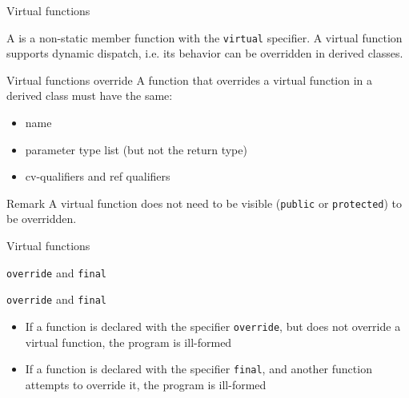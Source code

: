 \begin{frame}{Virtual functions}{}
  \begin{definition}
    A  is a non-static member function with the \lstinline!virtual! specifier. A virtual function supports dynamic dispatch, i.e. its behavior can be overridden in derived classes.
  \end{definition}

  \begin{block}{Virtual functions override}
    A function that overrides a virtual function in a derived class must have the same:
    \begin{itemize}
    \item
      name
    \item
      parameter type list (but not the return type)
    \item
      cv-qualifiers and ref qualifiers
    \end{itemize}
  \end{block}

  \begin{block}{Remark}
    A virtual function does not need to be visible (\lstinline!public! or \lstinline!protected!) to be overridden.
  \end{block}
\end{frame}

\begin{frame}{Virtual functions}{}
  \begin{example}
  \end{example}
\end{frame}

\begin{frame}{\texttt{override} and \texttt{final}}{}
  \begin{block}{\texttt{override} and \texttt{final}}
    \begin{itemize}
    \item
      If a function is declared with the specifier \lstinline!override!, but does not override a virtual function, the program is ill-formed
    \item
      If a function is declared with the specifier \lstinline!final!, and another function attempts to override it, the program is ill-formed
    \end{itemize}
  \end{block}
\end{frame}

